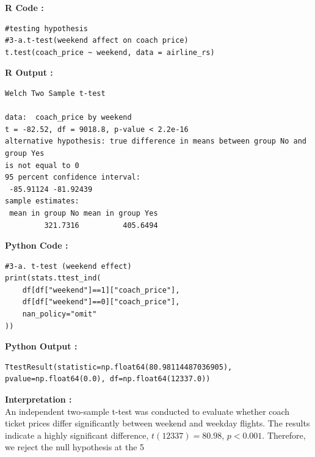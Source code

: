 \documentclass[11pt,a4paper]{article}
\begin{document}
\noindent \textbf{R Code :}
\begin{codebox}
\begin{lstlisting}[style=Rstyle]
#testing hypothesis
#3-a.t-test(weekend affect on coach price)
t.test(coach_price ~ weekend, data = airline_rs)

\end{lstlisting}
\end{codebox}
\newpage
\vspace{0.5em}
\noindent \textbf{R Output :}
\begin{verbatim}
Welch Two Sample t-test

data:  coach_price by weekend
t = -82.52, df = 9018.8, p-value < 2.2e-16
alternative hypothesis: true difference in means between group No and group Yes
is not equal to 0
95 percent confidence interval:
 -85.91124 -81.92439
sample estimates:
 mean in group No mean in group Yes 
         321.7316          405.6494

\end{verbatim}

\vspace{0.5em}
\noindent \textbf{Python Code :}
\begin{codebox}
\begin{lstlisting}[style=Pythonstyle]
#3-a. t-test (weekend effect)
print(stats.ttest_ind(
    df[df["weekend"]==1]["coach_price"],
    df[df["weekend"]==0]["coach_price"],
    nan_policy="omit"
))
\end{lstlisting}
\end{codebox}

\vspace{0.5em}
\noindent \textbf{Python Output :}

\begin{verbatim}
TtestResult(statistic=np.float64(80.98114487036905), 
pvalue=np.float64(0.0), df=np.float64(12337.0))

\end{verbatim}
\vspace{0.5em}
\noindent \textbf{Interpretation :} \\
An independent two-sample t-test was conducted to evaluate whether coach ticket prices differ significantly between weekend and weekday flights. The results indicate a highly significant difference, $t(12337) = 80.98$, $p < 0.001$. Therefore, we reject the null hypothesis at the 5%
\vspace{2.5em}
\end{document}
